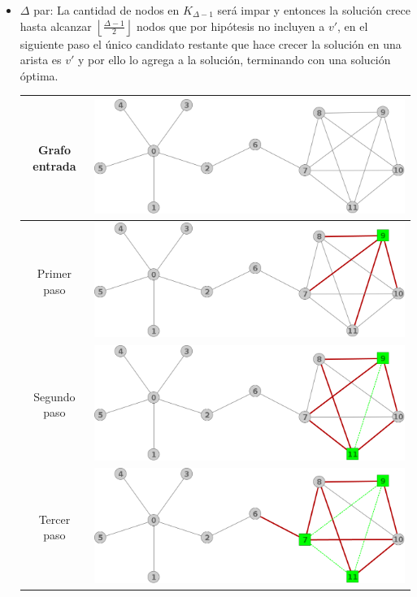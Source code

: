\begin{itemize}
	\item $\Delta$ par: La cantidad de nodos en $K_{\Delta -1}$ ser\'a impar 
	y entonces la soluci\'on crece hasta alcanzar
	$\left\lfloor \frac{\Delta -1}{2} \right\rfloor$ nodos que por hip\'otesis
	no incluyen a $v'$, en el siguiente paso el \'unico candidato restante
	que hace crecer la soluci\'on en una arista es $v'$ y por ello lo agrega 
	a la soluci\'on, terminando con una soluci\'on \'optima.
	\begin{center}
	\begin{tabular}{|c||c|}
		\hline
		Grafo entrada & 
		\includegraphics[scale = 0.2]{img/ej3/busqueda_local/estrellaPuenteCMFImpar.png} \\
		\hline
		Primer paso &
		\includegraphics[scale = 0.2]{img/ej3/busqueda_local/estrellaPuenteCMFImpar_st01.png} \\
		\hline
		Segundo paso &
		\includegraphics[scale = 0.2]{img/ej3/busqueda_local/estrellaPuenteCMFImpar_st02.png} \\
		\hline
		Tercer paso &
		\includegraphics[scale = 0.2]{img/ej3/busqueda_local/estrellaPuenteCMFImpar_st03.png} \\
		\hline


\end{tabular}
\end{center}
\end{itemize}
